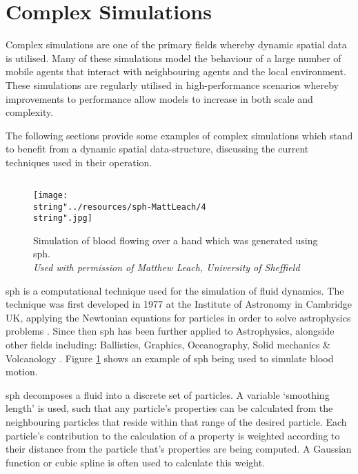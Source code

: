 \section{Complex Simulations\label{sec:complex-simulations}}
  Complex simulations are one of the primary fields whereby dynamic spatial data is utilised. Many of these simulations model the behaviour of a large number of mobile agents that interact with neighbouring agents and the local environment. These simulations are regularly utilised in high-performance scenarios whereby improvements to performance allow models to increase in both scale and complexity.
  
  The following sections provide some examples of complex simulations which stand to benefit from a dynamic spatial data-structure, discussing the current techniques used in their operation.

  \subsection{\label{sec:complex-sph}}
\begin{figure}
  \begin{centering}
    \texttt{[image: \\string"../resources/sph-MattLeach/4\\string".jpg]}
  \par\end{centering}
  \protect\caption[Simulation of blood flowing over a hand which was generated using \gls{sph}.]{\label{fig:sph}Simulation of blood flowing over a hand which was generated using \gls{sph}.\\ \em{Used with permission of Matthew Leach, University of Sheffield}}
\end{figure}
    \gls{sph} is a computational technique used for the simulation of fluid dynamics. The technique was first developed in 1977 at the Institute of Astronomy in Cambridge UK, applying the Newtonian equations for particles in order to solve astrophysics problems \cite{GM77,Luc77}. Since then \gls{sph} has been further applied to Astrophysics, alongside other fields including: Ballistics, Graphics, Oceanography, Solid mechanics \& Volcanology \cite{Mon12}. Figure \ref{fig:sph} shows an example of \gls{sph} being used to simulate blood motion.
    
    \gls{sph} decomposes a fluid into a discrete set of particles. A variable `smoothing length' is used, such that any particle's properties can be calculated from the neighbouring particles that reside within that range of the desired particle. Each particle's contribution to the calculation of a property is weighted according to their distance from the particle that's properties are being computed. A Gaussian function or cubic spline is often used to calculate this weight.
    
